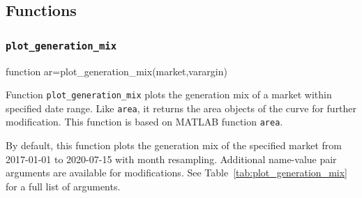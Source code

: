 \documentclass[10pt]{article}
\newcommand{\matlab}{\textsc{MATLAB}}
\numberwithin{equation}{section}
\numberwithin{table}{section}
\numberwithin{figure}{section}
\begin{document}
\subsection{Functions}

\subsubsection{\texttt{plot\_generation\_mix}}\label{func:plot_generation_mix}

\begin{Code}
function ar=plot_generation_mix(market,varargin)
\end{Code}

Function \verb!plot_generation_mix! plots the generation mix of a market within specified date range. Like \verb!area!, it returns the area objects of the curve for further modification. This function is based on \matlab{} function \verb!area!.

By default, this function plots the generation mix of the specified market from 2017-01-01 to 2020-07-15 with month resampling. Additional name-value pair arguments are available for modifications. See Table~\ref{tab:plot_generation_mix} for a full list of arguments.
\end{document}

